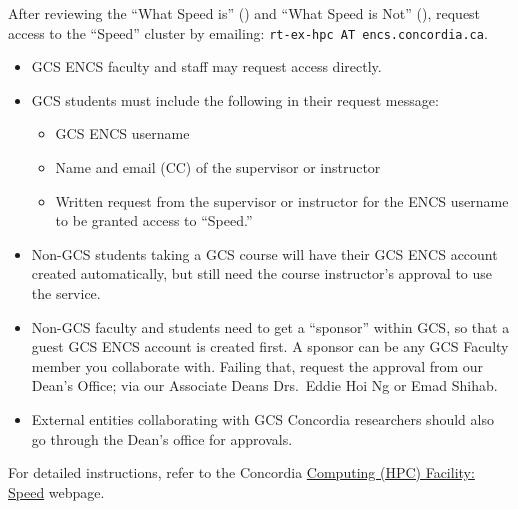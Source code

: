 
After reviewing the ``What Speed is'' () and
``What Speed is Not'' (), request access to the ``Speed'' 
cluster by emailing: \texttt{rt-ex-hpc AT encs.concordia.ca}.

\begin{itemize} 
	\item GCS ENCS faculty and staff may request access directly.
	\item GCS students must include the following in their request message:
	\begin{itemize}
		\item GCS ENCS username
		\item Name and email (CC) of the supervisor or instructor
		\item Written request from the supervisor or instructor for the ENCS username to be granted access to ``Speed.''
	\end{itemize}
	\item Non-GCS students taking a GCS course will have their GCS ENCS account created automatically, but still need the course instructor’s approval to use the service.
	\item Non-GCS faculty and students need to get a ``sponsor'' within GCS, so that a guest GCS ENCS account is created first. A sponsor can be any GCS Faculty member
	you collaborate with. Failing that, request the approval from our Dean's Office;
	via our Associate Deans Drs.\ Eddie Hoi Ng or Emad Shihab.
	\item External entities collaborating with GCS Concordia researchers should also go through the Dean’s office for approvals.
\end{itemize}

For detailed instructions, refer to the Concordia 
\href{https://www.concordia.ca/ginacody/aits/speed.html}{Computing (HPC) Facility: Speed} webpage.
